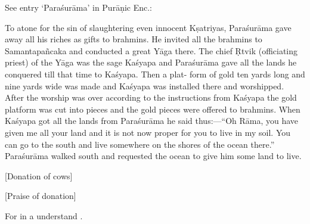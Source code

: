 { See entry `Paraśurāma' in Purāṇic Enc.:                 

                                 To atone for the sin of slaughtering even                                 innocent Kṣatriyas, Paraśurāma gave away all his                                 riches as gifts to brahmins. He invited all the brahmins                                 to Samantapañcaka and conducted a great Yāga there.                                 The chief Ṛtvik (officiating priest) of the Yāga was                                 the sage Kaśyapa and Paraśurāma gave all the lands                                 he conquered till that time to Kaśyapa. Then a plat-                                 form of gold ten yards long and nine yards wide was                                 made and Kaśyapa was installed there and worshipped.                                 After the worship was over according to the instructions                                 from Kaśyapa the gold platform was cut into pieces                                 and the gold pieces were offered to brahmins.                                 When Kaśyapa got all the lands from Paraśurāma he                                 said thus:—“Oh Rāma, you have given me all your                                 land and it is not now proper for you to live in my                                 soil. You can go to the south and live somewhere on                                 the shores of the ocean there.” Paraśurāma walked                                 south and requested the ocean to give him some land to                                 live.  }




\begin{center}{{[Donation of cows]}}\end{center}








\begin{center}{{[Praise of donation]}}\end{center}




{ For  in  a understand . }





